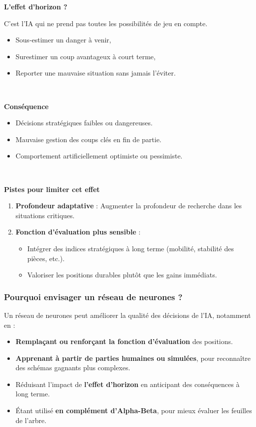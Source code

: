 \documentclass[9pt]{beamer}
\begin{document}
\begin{frame}
  \textbf{L'effet d'horizon ?}

  C'est l'IA qui ne prend pas toutes les possibilités de jeu en compte.
  \begin{itemize}
    \item Sous-estimer un danger à venir,
    \item Surestimer un coup avantageux à court terme,
    \item Reporter une mauvaise situation sans jamais l'éviter.
  \end{itemize}

  ~

  \textbf{Conséquence}
  \begin{itemize}
    \item Décisions stratégiques faibles ou dangereuses.
    \item Mauvaise gestion des coups clés en fin de partie.
    \item Comportement artificiellement optimiste ou pessimiste.
  \end{itemize}

  ~

  \textbf{Pistes pour limiter cet effet}
  \begin{enumerate}
    \item \textbf{Profondeur adaptative} : Augmenter la profondeur de recherche dans les situations critiques.
    \item \textbf{Fonction d’évaluation plus sensible} : 
    \begin{itemize}
      \item Intégrer des indices stratégiques à long terme (mobilité, stabilité des pièces, etc.).
      \item Valoriser les positions durables plutôt que les gains immédiats.
    \end{itemize}
  \end{enumerate}
\end{frame}

\begin{frame}
      \frametitle{Pourquoi envisager un réseau de neurones ?}
      Un réseau de neurones peut améliorer la qualité des décisions de l’IA, notamment en :

      \begin{itemize}
        \item \textbf{Remplaçant ou renforçant la fonction d’évaluation} des positions.
        \item \textbf{Apprenant à partir de parties humaines ou simulées}, pour reconnaître des schémas gagnants plus complexes.
        \item Réduisant l’impact de \textbf{l’effet d’horizon} en anticipant des conséquences à long terme.
        \item Étant utilisé \textbf{en complément d’Alpha-Beta}, pour mieux évaluer les feuilles de l’arbre.
      \end{itemize}
\end{frame}
\end{document}
